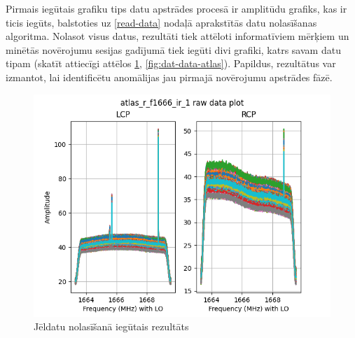 
Pirmais iegūtais grafiku tips datu apstrādes procesā ir amplitūdu grafiks, kas ir ticis iegūts, balstoties uz \ref{read-data} nodaļā aprakstītās datu nolasīšanas algoritma. Nolasot visus datus, rezultāti tiek attēloti informatīviem mērķiem un minētās novērojumu sesijas gadījumā tiek iegūti divi grafiki, katrs savam datu tipam (skatīt attiecīgi attēlos \ref{fig:raw-data-atlas}, \ref{fig:dat-data-atlas}). Papildus, rezultātus var izmantot, lai identificētu anomālijas jau pirmajā novērojumu apstrādes fāzē. 

\begin{figure}[H]
\centering
\includegraphics[width=\textwidth]{images/created/atlas-r-f1666-ir-1-raw.png}
\caption{Jēldatu nolasīšanā iegūtais rezultāts}
\label{fig:raw-data-atlas}
\end{figure}

